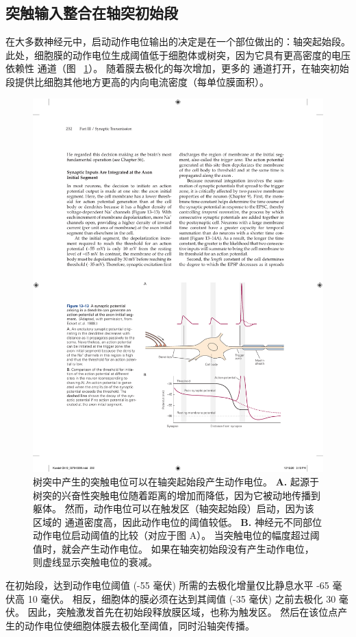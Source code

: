 \subsection{突触输入整合在轴突初始段}

在大多数神经元中，启动动作电位输出的决定是在一个部位做出的：轴突起始段。
此处，细胞膜的动作电位生成阈值低于细胞体或树突，因为它具有更高密度的电压依赖性  通道（图 ~\ref{fig:13_13}）。
随着膜去极化的每次增加，更多的  通道打开，在轴突初始段提供比细胞其他地方更高的内向电流密度（每单位膜面积）。


\begin{figure}[htbp]
	\centering
	\includegraphics[width=0.7\linewidth]{chap13/fig_13_13}
	\caption{树突中产生的突触电位可以在轴突起始段产生动作电位\cite{eckert1988propagation}。
		\textbf{A.} 起源于树突的兴奋性突触电位随着距离的增加而降低，因为它被动地传播到躯体。
		然而，动作电位可以在触发区（轴突起始段）启动，因为该区域的  通道密度高，因此动作电位的阈值较低。
		\textbf{B.} 神经元不同部位动作电位启动阈值的比较（对应于图 A）。
		当突触电位的幅度超过阈值时，就会产生动作电位。
		如果在轴突初始段没有产生动作电位，则虚线显示突触电位的衰减。}
	\label{fig:13_13}
\end{figure}


在初始段，达到动作电位阈值 (-55 毫伏) 所需的去极化增量仅比静息水平 -65 毫伏高 10 毫伏。
相反，细胞体的膜必须在达到其阈值 (-35 毫伏) 之前去极化 30 毫伏。
因此，突触激发首先在初始段释放膜区域，也称为触发区。
然后在该位点产生的动作电位使细胞体膜去极化至阈值，同时沿轴突传播。


